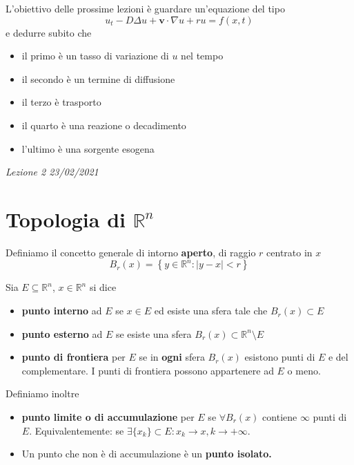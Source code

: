 \documentclass[10pt,a4paper,twoside,openright]{book}
\begin{document}
L'obiettivo delle prossime lezioni è guardare un'equazione del tipo
\begin{equation*}
u_{t} -D\Delta u+\mathbf{v} \cdotp \nabla u+ru=f(x,t)
\end{equation*}
e dedurre subito che
\begin{itemize}
\item il primo è un tasso di variazione di $u$ nel tempo
\item il secondo è un termine di diffusione
\item il terzo è trasporto
\item il quarto è una reazione o decadimento
\item l'ultimo è una sorgente esogena
\end{itemize}



\textit{Lezione 2 23/02/2021}
\section{Topologia di \texorpdfstring{$\mathbb{R}^{n}$}{Rn}}
\begin{definition}
 Definiamo il concetto generale di intorno \textbf{aperto}, di raggio $\displaystyle r$ centrato in $\displaystyle x$
\begin{equation*}
B_{r}(x) =\left\{y\in \mathbb{R}^{n} :| y-x| < r\right\}
\end{equation*}
\end{definition}
Sia $E\subseteq \mathbb{R}^{n}$, $x\in \mathbb{R}^{n}$ si dice
\begin{itemize}
\item \textbf{punto interno} ad $E$ se $x\in E$ ed esiste una sfera tale che $B_{r}(x) \subset E$
\item \textbf{punto esterno} ad $E$ se esiste una sfera $B_{r}(x) \subset \mathbb{R}^{n} \setminus E$
\item \textbf{punto di frontiera} per $E$ se in \textbf{ogni} sfera $B_{r}(x)$ esistono punti di $E$ e del complementare. I punti di frontiera possono appartenere ad $E$ o meno.
\end{itemize}

Definiamo inoltre
\begin{itemize}
\item \textbf{punto limite o di accumulazione} per $E$ se $\forall B_{r}(x)$ contiene $\infty $ punti di $E$. Equivalentemente: se $\exists \{x_{k}\} \subset E:x_{k}\rightarrow x,k\rightarrow +\infty $.
\item Un punto che non è di accumulazione è un \textbf{punto isolato.}
\end{itemize}
\end{document}
